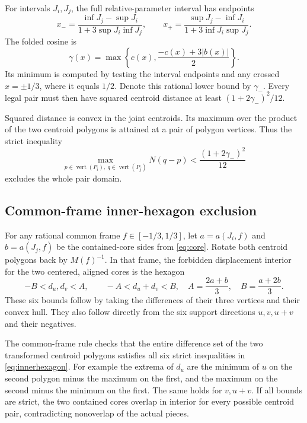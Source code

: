\documentclass[11pt]{article}
\begin{document}
For intervals $J_i,J_j$, the full relative-parameter interval has endpoints
\[
 x_- =\frac{\inf J_j-\sup J_i}{1+3\sup J_i\inf J_j},\qquad
 x_+ =\frac{\sup J_j-\inf J_i}{1+3\inf J_i\sup J_j}.
\]
The folded cosine is
\[
 \gamma(x)=\max\left\{c(x),\frac{-c(x)+3|b(x)|}{2}\right\}.
\]
Its minimum is computed by testing the interval endpoints and any crossed $x=\pm1/3$, where it equals $1/2$. Denote this rational lower bound by $\gamma_-$. Every legal pair must then have squared centroid distance at least $(1+2\gamma_-)^2/12$.

Squared distance is convex in the joint centroids. Its maximum over the product of the two centroid polygons is attained at a pair of polygon vertices. Thus the strict inequality
\begin{equation}\label{eq:distance-exclusion}
 \max_{p\in\operatorname{vert}(P_i),\ q\in\operatorname{vert}(P_j)}N(q-p)
 <\frac{(1+2\gamma_-)^2}{12}
\end{equation}
excludes the whole pair domain.

\subsection{Common-frame inner-hexagon exclusion}

For any rational common frame $f\in[-1/3,1/3]$, let $a=a(J_i,f)$ and $b=a(J_j,f)$ be the contained-core sides from \eqref{eq:core}. Rotate both centroid polygons back by $M(f)^{-1}$. In that frame, the forbidden displacement interior for the two centered, aligned cores is the hexagon
\begin{equation}\label{eq:innerhexagon}
 -B<d_u,d_v<A,\qquad -A<d_u+d_v<B,
 \quad A=\frac{2a+b}{3},\quad B=\frac{a+2b}{3}.
\end{equation}
These six bounds follow by taking the differences of their three vertices and their convex hull. They also follow directly from the six support directions $u,v,u+v$ and their negatives.

The common-frame rule checks that the entire difference set of the two transformed centroid polygons satisfies all six strict inequalities in \eqref{eq:innerhexagon}. For example the extrema of $d_u$ are the minimum of $u$ on the second polygon minus the maximum on the first, and the maximum on the second minus the minimum on the first. The same holds for $v,u+v$. If all bounds are strict, the two contained cores overlap in interior for every possible centroid pair, contradicting nonoverlap of the actual pieces.
\end{document}
